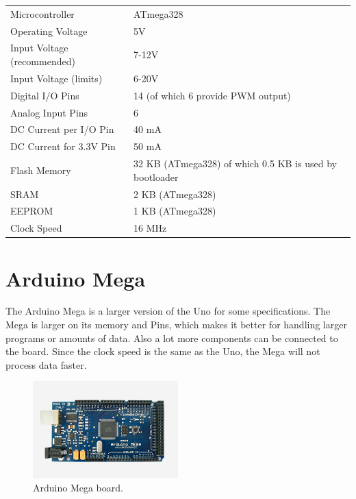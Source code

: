 \begin{table}
\begin{tabular}{| l | l |}
\hline
Microcontroller & ATmega328\\
Operating Voltage & 5V\\
Input Voltage (recommended) & 7-12V\\
Input Voltage (limits) & 6-20V\\
Digital I/O Pins & 14 (of which 6 provide PWM output)\\
Analog Input Pins & 6\\
DC Current per I/O Pin & 40 mA\\
DC Current for 3.3V Pin & 50 mA\\
Flash Memory & 32 KB (ATmega328) of which 0.5 KB is used by bootloader\\
SRAM & 2 KB (ATmega328)\\
EEPROM & 1 KB (ATmega328)\\
Clock Speed & 16 MHz\\
\hline
\end{tabular}
\end{table}
\label{tab:unospec}
\section{Arduino Mega}
The Arduino Mega is a larger version of the Uno for some specifications. The Mega is larger on its memory and Pins, which makes it better for handling larger programs or amounts of data. Also a lot more components can be connected to the board. Since the clock speed is the same as the Uno, the Mega will not process data faster.

\begin{figure}[h!]
\centering
\includegraphics[width=0.5\textwidth]{chapters/analysis/figs/ArduinoMega.jpg}
\caption{Arduino Mega board\cite{arduinomega}.}
\label{fig:arduinomega}
\end{figure}

